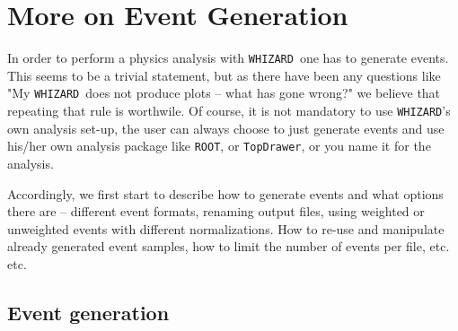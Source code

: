 \documentclass[12pt]{book}
\newcommand{\ttt}[1]{\texttt{#1}}
\newcommand{\whizard}{\ttt{WHIZARD}}
\begin{document}
\chapter{More on Event Generation}
\label{chap:events}

In order to perform a physics analysis with \whizard\ one has to
generate events. This seems to be a trivial statement, but as there
have been any questions like "My \whizard\ does not produce plots --
what has gone wrong?" we believe that repeating that rule is
worthwile. Of course, it is not mandatory to use \whizard's own analysis
set-up, the user can always choose to just generate events and use
his/her own analysis package like \ttt{ROOT}, or \ttt{TopDrawer}, or
you name it for the analysis.

Accordingly, we first start to describe how to generate events and
what options there are -- different event formats, renaming output
files, using weighted or unweighted events with different
normalizations. How to re-use and manipulate already generated event
samples, how to limit the number of events per file, etc. etc.

\section{Event generation}
\end{document}
